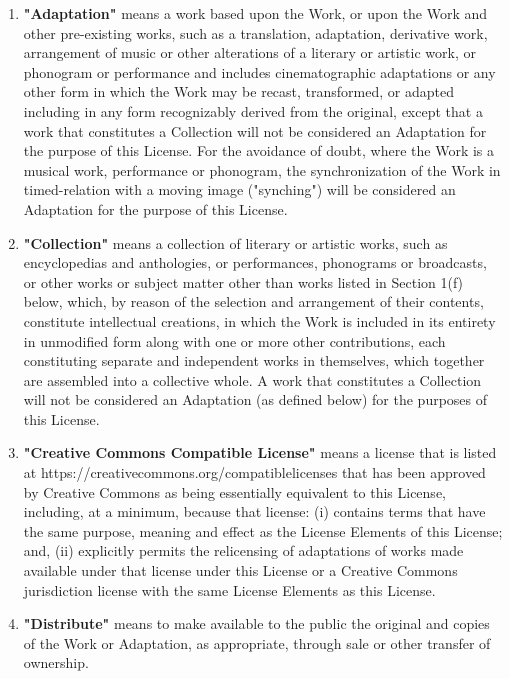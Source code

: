     \begin{enumerate}[noitemsep,label=\alph*.]
    
      \item \textbf{"Adaptation"} means a work based upon the Work, or upon the Work and other pre-existing works, such as a translation, adaptation, derivative work, arrangement of music or other alterations of a literary or artistic work, or phonogram or performance and includes cinematographic adaptations or any other form in which the Work may be recast, transformed, or adapted including in any form recognizably derived from the original, except that a work that constitutes a Collection will not be considered an Adaptation for the purpose of this License. For the avoidance of doubt, where the Work is a musical work, performance or phonogram, the synchronization of the Work in timed-relation with a moving image ("synching") will be considered an Adaptation for the purpose of this License.
      
      \item \textbf{"Collection"} means a collection of literary or artistic works, such as encyclopedias and anthologies, or performances, phonograms or broadcasts, or other works or subject matter other than works listed in Section 1(f) below, which, by reason of the selection and arrangement of their contents, constitute intellectual creations, in which the Work is included in its entirety in unmodified form along with one or more other contributions, each constituting separate and independent works in themselves, which together are assembled into a collective whole. A work that constitutes a Collection will not be considered an Adaptation (as defined below) for the purposes of this License.
      
      \item \textbf{"Creative Commons Compatible License"} means a license that is listed at https://creativecommons.org/compatiblelicenses that has been approved by Creative Commons as being essentially equivalent to this License, including, at a minimum, because that license: (i) contains terms that have the same purpose, meaning and effect as the License Elements of this License; and, (ii) explicitly permits the relicensing of adaptations of works made available under that license under this License or a Creative Commons jurisdiction license with the same License Elements as this License.
      
      \item \textbf{"Distribute"} means to make available to the public the original and copies of the Work or Adaptation, as appropriate, through sale or other transfer of ownership.
      

\end{enumerate}
